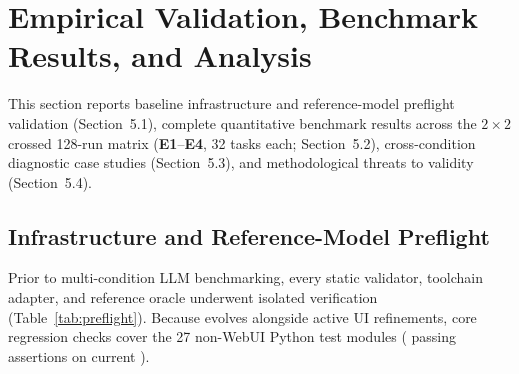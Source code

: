 
\section{Empirical Validation, Benchmark Results, and Analysis}

This section reports baseline infrastructure and reference-model preflight validation (Section~5.1), complete quantitative benchmark results across the $2 \times 2$ crossed 128-run matrix (\textbf{E1}--\textbf{E4}, 32 tasks each; Section~5.2), cross-condition diagnostic case studies (Section~5.3), and methodological threats to validity (Section~5.4).

\subsection{Infrastructure and Reference-Model Preflight}
Prior to multi-condition LLM benchmarking, every static validator, toolchain adapter, and reference oracle underwent isolated verification (Table~\ref{tab:preflight}). Because  evolves alongside active UI refinements, core regression checks cover the 27 non-WebUI Python test modules ( passing assertions on current ).

